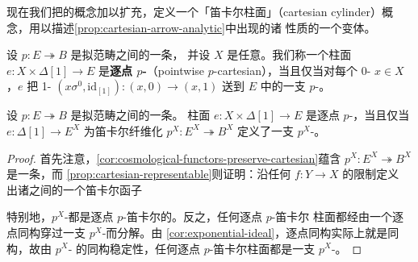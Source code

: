 现在我们把\trCartesianArrow{}的概念加以扩充，定义一个「笛卡尔柱面」（cartesian
cylinder）概念，用以描述\cref{prop:cartesian-arrow-analytic}中出现的诸%
\trLifting{}性质的一个变体。

\begin{definition}[笛卡尔柱面]\label{def:cartesian-cylinders}
设 $p\colon E\twoheadrightarrow B$ 是拟范畴之间的一条\trCartesianFibration，
并设 $X$ 是任意\trSimplicialSet。我们称一个柱面 $e\colon X\times\Delta[1]\to E$
是\textbf{逐点 $p$-\trCartesian}（pointwise $p$-cartesian），当且仅当对每个
0-\trSimplex{} $x\in X$，$e$ 把 1-\trSimplex{}
$(x\sigma^{0},\mathrm{id}_{[1]})\colon(x,0)\to(x,1)$ 送到 $E$ 中的一支
$p$-\trCartesianArrow。
\end{definition}

\begin{lemma}\label{lem:pointwise-pcartesian-cylinder}
设 $p\colon E\twoheadrightarrow B$ 是拟范畴之间的一条\trCartesianFibration。
柱面 $e\colon X\times\Delta[1]\to E$ 是逐点 $p$-\trCartesian{}，当且仅当
$e\colon\Delta[1]\to E^{X}$ 为笛卡尔纤维化
$p^{X}\colon E^{X}\twoheadrightarrow B^{X}$ 定义了一支 $p^{X}$-\trCartesianArrow。
\end{lemma}

\begin{proof}
首先注意，\cref{cor:cosmological-functors-preserve-cartesian}蕴含
$p^{X}\colon E^{X}\twoheadrightarrow B^{X}$ 是一条\trCartesianFibration，而
\cref{prop:cartesian-representable}则证明：沿任何 $f\colon Y\to X$ 的限制定义
出诸\trCartesianFibration{}之间的一个笛卡尔函子
\begin{center}
\end{center}
特别地，$p^{X}$-\trCartesianArrow{}都是逐点 $p$-笛卡尔的。反之，任何逐点 $p$-笛卡尔
柱面都经由一个逐点同构穿过一支 $p^{X}$-\trCartesianArrow{}而分解。由
\cref{cor:exponential-ideal}，逐点同构实际上就是同构，故由 $p^{X}$-\trCartesianArrow{}%
的同构稳定性，任何逐点 $p$-笛卡尔柱面都是一支 $p^{X}$-\trCartesianArrow。
\end{proof}

